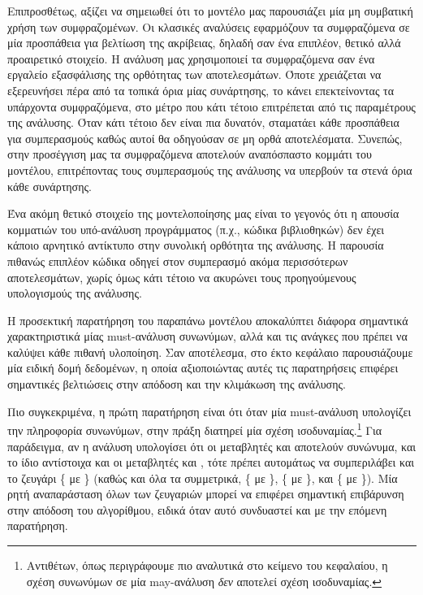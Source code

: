 Επιπροσθέτως, αξίζει να σημειωθεί ότι το μοντέλο μας παρουσιάζει μία μη συμβατική χρήση των συμφραζομένων. Οι κλασικές αναλύσεις εφαρμόζουν τα συμφραζόμενα σε μία προσπάθεια για βελτίωση της ακρίβειας, δηλαδή σαν ένα επιπλέον, θετικό αλλά προαιρετικό στοιχείο. Η ανάλυση μας χρησιμοποιεί τα συμφραζόμενα σαν ένα εργαλείο εξασφάλισης της ορθότητας των αποτελεσμάτων. Όποτε χρειάζεται να εξερευνήσει πέρα από τα τοπικά όρια μίας συνάρτησης, το κάνει επεκτείνοντας τα υπάρχοντα συμφραζόμενα, στο μέτρο που κάτι τέτοιο επιτρέπεται από τις παραμέτρους της ανάλυσης. Όταν κάτι τέτοιο δεν είναι πια δυνατόν, σταματάει κάθε προσπάθεια για συμπερασμούς καθώς αυτοί θα οδηγούσαν σε μη ορθά αποτελέσματα. Συνεπώς, στην προσέγγιση μας τα συμφραζόμενα αποτελούν αναπόσπαστο κομμάτι του μοντέλου, επιτρέποντας τους συμπερασμούς της ανάλυσης να υπερβούν τα στενά όρια κάθε συνάρτησης.

Ένα ακόμη θετικό στοιχείο της μοντελοποίησης μας είναι το γεγονός ότι η απουσία κομματιών του υπό-ανάλυση προγράμματος (π.χ., κώδικα βιβλιοθηκών) δεν έχει κάποιο αρνητικό αντίκτυπο στην συνολική ορθότητα της ανάλυσης. Η παρουσία πιθανώς επιπλέον κώδικα οδηγεί στον συμπερασμό ακόμα περισσότερων αποτελεσμάτων, χωρίς όμως κάτι τέτοιο να ακυρώνει τους προηγούμενους υπολογισμούς της ανάλυσης.


Η προσεκτική παρατήρηση του παραπάνω μοντέλου αποκαλύπτει διάφορα σημαντικά χαρακτηριστικά μίας {\en must-}ανάλυση συνωνύμων, αλλά και τις ανάγκες που πρέπει να καλύψει κάθε πιθανή υλοποίηση. Σαν αποτέλεσμα, στο έκτο κεφάλαιο παρουσιάζουμε μία ειδική δομή δεδομένων, η οποία αξιοποιώντας αυτές τις παρατηρήσεις επιφέρει σημαντικές βελτιώσεις στην απόδοση και την κλιμάκωση της ανάλυσης.

Πιο συγκεκριμένα, η πρώτη παρατήρηση είναι ότι όταν μία {\en must-}ανάλυση υπολογίζει την πληροφορία συνωνύμων, στην πράξη διατηρεί μία σχέση ισοδυναμίας.\footnote{Αντιθέτων, όπως περιγράφουμε πιο αναλυτικά στο κείμενο του κεφαλαίου, η σχέση συνωνύμων σε μία {\en may-}ανάλυση \emph{δεν} αποτελεί σχέση ισοδυναμίας.} Για παράδειγμα, αν η ανάλυση υπολογίσει ότι οι μεταβλητές {\en {}} και {\en {}} αποτελούν συνώνυμα, και το ίδιο αντίστοιχα και οι μεταβλητές {\en {}} και {\en {}}, τότε πρέπει αυτομάτως να συμπεριλάβει και το ζευγάρι \{{\en {}} με {\en {}}\} (καθώς και όλα τα συμμετρικά, \{{\en {}} με {\en {}}\}, \{{\en {}} με {\en {}}\}, και \{{\en {}} με {\en {}}\}). Μία ρητή αναπαράσταση όλων των ζευγαριών μπορεί να επιφέρει σημαντική επιβάρυνση στην απόδοση του αλγορίθμου, ειδικά όταν αυτό συνδυαστεί και με την επόμενη παρατήρηση.


